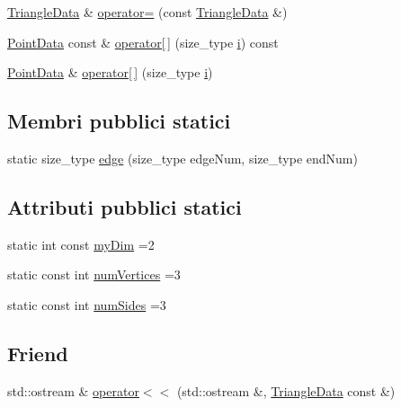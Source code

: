 \begin{DoxyCompactItemize}
\hyperlink{classTriangleData}{Triangle\-Data} \& \hyperlink{classTriangleData_a60f17e960b9a70790aae6bb4e607740b}{operator=} (const \hyperlink{classTriangleData}{Triangle\-Data} \&)
\item 
\hyperlink{classPointData}{Point\-Data} const \& \hyperlink{classTriangleData_ada8cc2e9bcbf4a2fc80d2a753e32d74d}{operator\mbox{[}$\,$\mbox{]}} (size\-\_\-type \hyperlink{matrici_8m_a6f6ccfcf58b31cb6412107d9d5281426}{i}) const 
\item 
\hyperlink{classPointData}{Point\-Data} \& \hyperlink{classTriangleData_ab7d75e8ec4a88a32acc3aef2da96eb80}{operator\mbox{[}$\,$\mbox{]}} (size\-\_\-type \hyperlink{matrici_8m_a6f6ccfcf58b31cb6412107d9d5281426}{i})
\end{DoxyCompactItemize}
\subsection*{Membri pubblici statici}
\begin{DoxyCompactItemize}
\item 
static size\-\_\-type \hyperlink{classTriangleData_a32634f5f869bda807ccde85f226fd4ff}{edge} (size\-\_\-type edge\-Num, size\-\_\-type end\-Num)
\end{DoxyCompactItemize}
\subsection*{Attributi pubblici statici}
\begin{DoxyCompactItemize}
\item 
static int const \hyperlink{classTriangleData_aba0f696d79a127708f9cd73ffaa13ec9}{my\-Dim} =2
\item 
static const int \hyperlink{classTriangleData_a30d9f452a2cab5b864084d13b7076908}{num\-Vertices} =3
\item 
static const int \hyperlink{classTriangleData_a9c499ade75343930cf6722c8e39d9485}{num\-Sides} =3
\end{DoxyCompactItemize}
\subsection*{Friend}
\begin{DoxyCompactItemize}
\item 
std\-::ostream \& \hyperlink{classTriangleData_ac2713c410c9d8f1bf2e0d85392aeb257}{operator$<$$<$} (std\-::ostream \&, \hyperlink{classTriangleData}{Triangle\-Data} const \&)
\end{DoxyCompactItemize}


